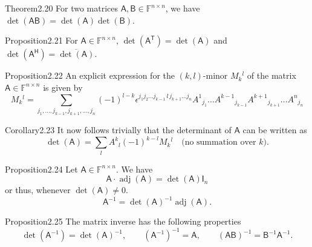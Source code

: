 \begin{res}{Theorem}{2.20}
For two matrices $\mathsf A,\mathsf B\in\mathbb F^{n\times n}$, we have $\det(\mathsf{AB})=\det(\mathsf A)\det(\mathsf B)$.
\end{res}

\begin{res}{Proposition}{2.21}
For $\mathsf A\in\mathbb F^{n\times n}$, $\det(\mathsf A^{\mathsf T})=\det(\mathsf A)$ and $\det(\mathsf A^{\mathsf H})=\overline{\det(\mathsf A)}$.
\end{res}

\begin{res}{Proposition}{2.22}
An explicit expression for the $(k,l)$-minor $M_k{}^l$ of the matrix $\mathsf A\in\mathbb F^{n\times n}$ is given by
\begin{equation}M_k{}^l=\sum_{j_1,\dots,j_{k-1},j_{k+1},\dots,j_n}(-1)^{l-k}\epsilon^{j_1j_2\ldots j_{k-1}\,l\,j_{k+1}\ldots j_n}A^1{}_{j_1}\ldots A^{k-1}{}_{j_{k-1}}A^{k+1}{}_{j_{k+1}}\ldots A^n{}_{j_n}\tag{2.18}\end{equation}
\end{res}

\begin{res}{Corollary}{2.23}
It now follows trivially that the determinant of $\mathsf A$ can be written as
\begin{equation}\det(\mathsf A)=\sum_l A^k{}_l(-1)^{k-l}M_k{}^l\quad\text{(no summation over $k$).}\tag{2.19}\end{equation}
\end{res}

\begin{res}{Proposition}{2.24}
Let $\mathsf A\in\mathbb F^{n\times n}$. We have
\begin{equation}\mathsf A\cdot\operatorname{adj}(\mathsf A)=\det(\mathsf A)\mathsf I_n\tag{2.22}\end{equation}
or thus, whenever $\det(\mathsf A)\ne0$.
\begin{equation}\mathsf A^{-1}=\det(\mathsf A)^{-1}\operatorname{adj}(\mathsf A).\tag{2.23}\end{equation}
\end{res}

\begin{res}{Proposition}{2.25}
The matrix inverse has the following properties
\[\det(\mathsf A^{-1})=\det(\mathsf A)^{-1},\qquad(\mathsf A^{-1})^{-1}=\mathsf A,\qquad(\mathsf{AB})^{-1}=\mathsf B^{-1}\mathsf A^{-1}.\]
\end{res}

